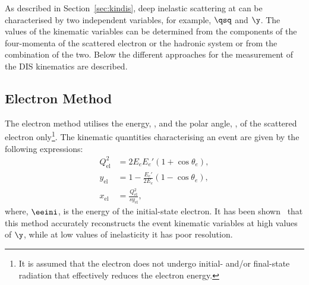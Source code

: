As described in Section~\ref{sec:kindis}, deep inelastic scattering at \hera can be characterised by two independent variables, for example, $\qsq$ and $\y$. The values of the kinematic variables can be determined from the components of the four-momenta of the scattered electron or the hadronic system or from the combination of the two. Below the different approaches for the measurement of the DIS kinematics are described.
\subsection{Electron Method}
\label{subsec:em}
The electron method utilises the energy, \eefin, and the polar angle, \thetae, of the scattered electron only\footnote{It is assumed that the electron does not undergo initial- and/or final-state radiation that effectively reduces the electron energy.}. The kinematic quantities characterising an event are given by the following expressions:
\begin{align}
	Q^2_\text{el} &= 2 E_e E_e' \left( 1 + \cos \theta_e \right),			\label{eq:q2el}							\\
	y_\text{el}      &= 1 - \frac{E_e'}{2 E_e}\left( 1 - \cos \theta_e \right),			\label{eq:yel} \\
	x_\text{el}      &= \frac{Q^2_\text{el}}{s y_\text{el}},			\label{eq:xel}
\end{align}
where, $\eeini$, is the energy of the initial-state electron. It has been shown~\cite{nim:a426:583} that this method accurately reconstructs the event kinematic variables at high values of $\y$, while at low values of inelasticity it has poor resolution.
